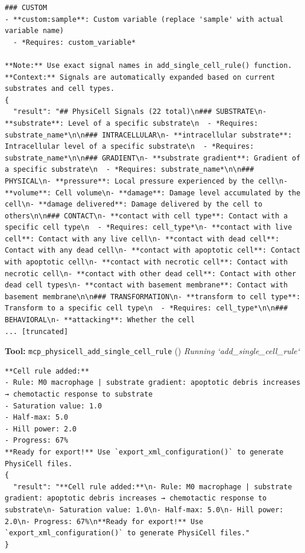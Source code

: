 \documentclass[11pt,a4paper]{article}
\begin{document}
\begin{toolokbox}
\begin{lstlisting}
### CUSTOM
- **custom:sample**: Custom variable (replace 'sample' with actual variable name)
  - *Requires: custom_variable*

**Note:** Use exact signal names in add_single_cell_rule() function.
**Context:** Signals are automatically expanded based on current substrates and cell types.
{
  "result": "## PhysiCell Signals (22 total)\n### SUBSTRATE\n- **substrate**: Level of a specific substrate\n  - *Requires: substrate_name*\n\n### INTRACELLULAR\n- **intracellular substrate**: Intracellular level of a specific substrate\n  - *Requires: substrate_name*\n\n### GRADIENT\n- **substrate gradient**: Gradient of a specific substrate\n  - *Requires: substrate_name*\n\n### PHYSICAL\n- **pressure**: Local pressure experienced by the cell\n- **volume**: Cell volume\n- **damage**: Damage level accumulated by the cell\n- **damage delivered**: Damage delivered by the cell to others\n\n### CONTACT\n- **contact with cell type**: Contact with a specific cell type\n  - *Requires: cell_type*\n- **contact with live cell**: Contact with any live cell\n- **contact with dead cell**: Contact with any dead cell\n- **contact with apoptotic cell**: Contact with apoptotic cell\n- **contact with necrotic cell**: Contact with necrotic cell\n- **contact with other dead cell**: Contact with other dead cell types\n- **contact with basement membrane**: Contact with basement membrane\n\n### TRANSFORMATION\n- **transform to cell type**: Transform to a specific cell type\n  - *Requires: cell_type*\n\n### BEHAVIORAL\n- **attacking**: Whether the cell 
... [truncated]
\end{lstlisting}
\end{toolokbox}
\begin{toolokbox}
\textbf{Tool:} \texttt{mcp\_physicell\_add\_single\_cell\_rule} (\checkmark)
\textit{Running `add\_single\_cell\_rule`}
\begin{lstlisting}
**Cell rule added:**
- Rule: M0 macrophage | substrate gradient: apoptotic debris increases → chemotactic response to substrate
- Saturation value: 1.0
- Half-max: 5.0
- Hill power: 2.0
- Progress: 67%
**Ready for export!** Use `export_xml_configuration()` to generate PhysiCell files.
{
  "result": "**Cell rule added:**\n- Rule: M0 macrophage | substrate gradient: apoptotic debris increases → chemotactic response to substrate\n- Saturation value: 1.0\n- Half-max: 5.0\n- Hill power: 2.0\n- Progress: 67%\n**Ready for export!** Use `export_xml_configuration()` to generate PhysiCell files."
}
\end{lstlisting}
\end{toolokbox}
\end{document}

